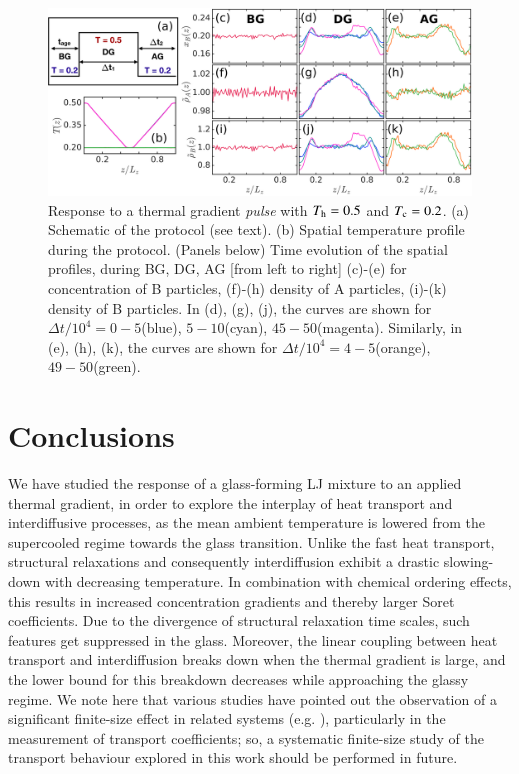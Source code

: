 %
\begin{figure}[hbt!]
	\centerline{\includegraphics[scale=0.45]{figs/fig3p11.png}}
	\caption[{\em Response to a thermal gradient {\em pulse} with $T_{\rm h}=0.5$ and $T_{\rm c}=0.2$}]{Response to a thermal gradient {\em pulse} with $T_{\rm h}=0.5$ and $T_{\rm c}=0.2$. (a) Schematic of the protocol (see text).  (b) Spatial temperature profile during the protocol.  (Panels below) Time evolution of the spatial profiles, during BG, DG, AG [from left to right] (c)-(e) for concentration of B particles, (f)-(h) density of A particles, (i)-(k) density of B particles.  In (d), (g), (j), the curves are shown for $\Delta{t}/10^4=0-5$(blue), $5-10$(cyan), $45-50$(magenta).  Similarly, in (e), (h), (k), the curves are shown for $\Delta{t}/10^4=4-5$(orange), $49-50$(green).
	\label{fig3p11}}
\end{figure}
%

\section{Conclusions} 

We have studied the response of a glass-forming LJ mixture to an applied thermal gradient, in order to explore the interplay of heat transport and interdiffusive processes, as the mean ambient temperature is lowered from the supercooled regime towards the glass transition. Unlike the fast heat transport, structural relaxations and consequently interdiffusion exhibit a drastic slowing-down with decreasing temperature. In combination with chemical ordering effects, this results in increased concentration gradients and thereby larger Soret coefficients.  Due to the divergence of structural relaxation time scales, such features get suppressed in the glass. Moreover, the linear coupling between heat transport and interdiffusion breaks down when the thermal gradient is large, and the lower bound for this breakdown decreases while approaching the glassy regime. We note here that various studies have pointed out the observation of a significant finite-size effect in related systems (e.g. \cite{chantrenne2004finite, simonnin2017diffusion}), particularly in the measurement of transport coefficients; so, a systematic finite-size study of the transport behaviour explored in this work should be performed in future.

